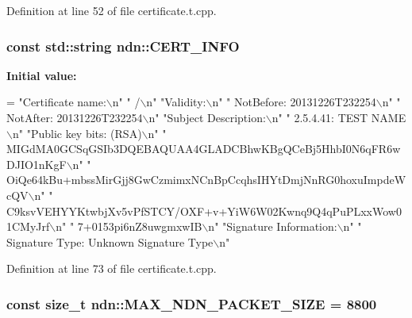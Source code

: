 \begin{DoxyVerb}
Definition at line 52 of file certificate.\+t.\+cpp.

\subsubsection[{\texorpdfstring{C\+E\+R\+T\+\_\+\+I\+N\+FO}{CERT\_INFO}}]{\setlength{\rightskip}{0pt plus 5cm}const std\+::string ndn\+::\+C\+E\+R\+T\+\_\+\+I\+N\+FO}\hypertarget{namespacendn_a9c8975661f4a35298e509bb1710d0a00}{}\label{namespacendn_a9c8975661f4a35298e509bb1710d0a00}
{\bfseries Initial value\+:}
\begin{DoxyCode}
= \textcolor{stringliteral}{"Certificate name:\(\backslash\)n"}
  \textcolor{stringliteral}{"  /\(\backslash\)n"}
  \textcolor{stringliteral}{"Validity:\(\backslash\)n"}
  \textcolor{stringliteral}{"  NotBefore: 20131226T232254\(\backslash\)n"}
  \textcolor{stringliteral}{"  NotAfter: 20131226T232254\(\backslash\)n"}
  \textcolor{stringliteral}{"Subject Description:\(\backslash\)n"}
  \textcolor{stringliteral}{"  2.5.4.41: TEST NAME\(\backslash\)n"}
  \textcolor{stringliteral}{"Public key bits: (RSA)\(\backslash\)n"}
  \textcolor{stringliteral}{"  MIGdMA0GCSqGSIb3DQEBAQUAA4GLADCBhwKBgQCeBj5HhbI0N6qFR6wDJIO1nKgF\(\backslash\)n"}
  \textcolor{stringliteral}{"  OiQe64kBu+mbssMirGjj8GwCzmimxNCnBpCcqhsIHYtDmjNnRG0hoxuImpdeWcQV\(\backslash\)n"}
  \textcolor{stringliteral}{"  C9ksvVEHYYKtwbjXv5vPfSTCY/OXF+v+YiW6W02Kwnq9Q4qPuPLxxWow01CMyJrf\(\backslash\)n"}
  \textcolor{stringliteral}{"  7+0153pi6nZ8uwgmxwIB\(\backslash\)n"}
  \textcolor{stringliteral}{"Signature Information:\(\backslash\)n"}
  \textcolor{stringliteral}{"  Signature Type: Unknown Signature Type\(\backslash\)n"}
\end{DoxyCode}


Definition at line 73 of file certificate.\+t.\+cpp.

\subsubsection[{\texorpdfstring{M\+A\+X\+\_\+\+N\+D\+N\+\_\+\+P\+A\+C\+K\+E\+T\+\_\+\+S\+I\+ZE}{MAX\_NDN\_PACKET\_SIZE}}]{\setlength{\rightskip}{0pt plus 5cm}const size\+\_\+t ndn\+::\+M\+A\+X\+\_\+\+N\+D\+N\+\_\+\+P\+A\+C\+K\+E\+T\+\_\+\+S\+I\+ZE = 8800}\hypertarget{namespacendn_a8117ecf631e92bab09eb41b92ac9b2b6}{}\label{namespacendn_a8117ecf631e92bab09eb41b92ac9b2b6}



\end{DoxyVerb}
